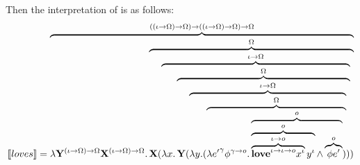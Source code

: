 Then the interpretation of  is as follows:
\begin{align}
\I{loves} = \overbrace{\lambda \Y2^{(\iota \rightarrow \Omega) \rightarrow \Omega} \X2^{(\iota \rightarrow \Omega) \rightarrow \Omega}.  \overbrace{\X2 ( \overbrace{\lambda \x1.  \overbrace{\Y2 ( \overbrace{\lambda \y1. (  \overbrace{\lambda {e'}^{\gamma} \phi^{\gamma \rightarrow o}. \overbrace{\overbrace{\overbrace{{\textbf{love}}^{\iota \rightarrow \iota \rightarrow o} {\x1}^{\iota}}^{\iota \rightarrow o} {\y1}^{\iota}}^{o} \land \overbrace{\phi e'}^{o}}^{o} )}^{\Omega}}^{\iota \rightarrow \Omega} )}^{\Omega}}^{\iota \rightarrow \Omega} )}^{\Omega} }^{((\iota \rightarrow \Omega) \rightarrow \Omega) \rightarrow ((\iota \rightarrow \Omega) \rightarrow \Omega) \rightarrow \Omega} \label{eq:dG:love}
\end{align}


